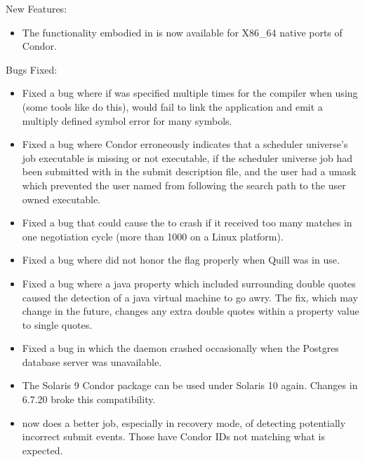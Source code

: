 \noindent New Features:

\begin{itemize}

\item The functionality embodied in   is now
available for X86\_64 native ports of Condor.

\end{itemize}

\noindent Bugs Fixed:

\begin{itemize}

\item Fixed a bug where if  was specified multiple times for
the compiler when using  (some tools like 
do this),  would fail to link the application and emit
a multiply defined symbol error for many symbols.

\item Fixed a bug where Condor erroneously indicates that a scheduler
universe's job executable is missing or not executable, if the scheduler
universe job had been submitted with
 in the submit
description file, and the user had a umask which prevented the user
named  from following the search path to the
user owned executable.

\item Fixed a bug that could cause the  to crash if it
received too many matches in one negotiation cycle (more than 1000 on a
Linux platform).

\item Fixed a bug where  did not honor the  flag
properly when Quill was in use.

\item Fixed a bug where a java property which included surrounding double quotes
caused the detection of a java virtual machine to go awry. 
The fix, which may change in the future, changes any extra double quotes
within a property value to single quotes.

\item Fixed a bug in which the  daemon 
crashed occasionally when the Postgres database
server was unavailable.

\item The Solaris 9 Condor package can be used under Solaris 10 again.
Changes in 6.7.20 broke this compatibility.

\item {} now does a better job, especially in recovery mode,
of detecting potentially incorrect submit events.
Those have Condor IDs not matching what is expected.


\end{itemize}
